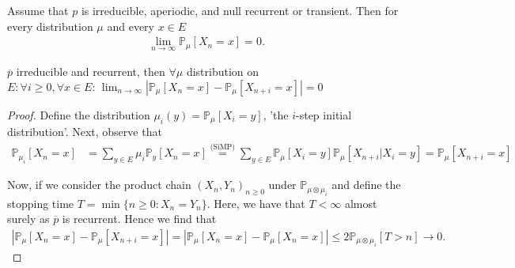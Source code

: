 \begin{theorem}[]
	Assume that $p$ is irreducible, aperiodic, and null recurrent or transient. Then for every distribution $\mu $ and every $x \in E$  
	\begin{align}
\boxed{	\lim_{n \to \infty}\mathbb{P}_{\mu } \left[ X_n =x \right] = 0 }
.	\end{align}
	
\end{theorem}
\begin{lemma}[]
	$\overline{p}$ irreducible and recurrent, then $\forall \mu $ distribution on $E: \forall i\geq 0, \forall x \in E:\, \lim_{n \to \infty} | \mathbb{P}_{\mu } \left[ X_n=x \right] - \mathbb{P}_{\mu } \left[ X_{n+i}=x \right] | = 0$
\end{lemma}
\begin{proof}
	Define the distribution $\mu_i(y) = \mathbb{P}_{\mu } \left[ X_i = y \right] $, 'the $i$-step initial distribution'. Next, observe that
\begin{align}
	\mathbb{P}_{\mu _i} \left[ X_n = x \right] &= \sum_{y \in E}^{} \mu _i \mathbb{P}_{y} \left[ X_n = x \right] 
	\stackrel{\textrm{(SiMP)}}{=} \sum_{y \in E}^{} \mathbb{P}_{\mu } \left[ X_i = y \right] \mathbb{P}_{\mu } \left[ X_{n+i} | X_i = y\right] 
	= \mathbb{P}_{\mu } \left[ X_{n+i}=x \right] 
\end{align}

Now, if we consider the product chain $(X_n, Y_n)_{n\geq 0}$ under $\mathbb{P}_{\mu \otimes \mu_i} $ and define the stopping time $T= \min\{n\geq 0: X_n = Y_n\}$. Here, we have that $T<\infty$ almost surely as $\overline{p}$ is recurrent. Hence we find that
\begin{align}
	\left| \mathbb{P}_{\mu } \left[ X_n = x \right] - \mathbb{P}_{\mu } \left[ X_{n+i} = x \right] \right|
	= \left| \mathbb{P}_{\mu } \left[ X_n = x \right] - \mathbb{P}_{\mu} \left[ X_n = x \right] \right| 
	\leq 2  \mathbb{P}_{\mu \otimes \mu _i} \left[ T>n \right]  \to 0.
\end{align}
\end{proof}
